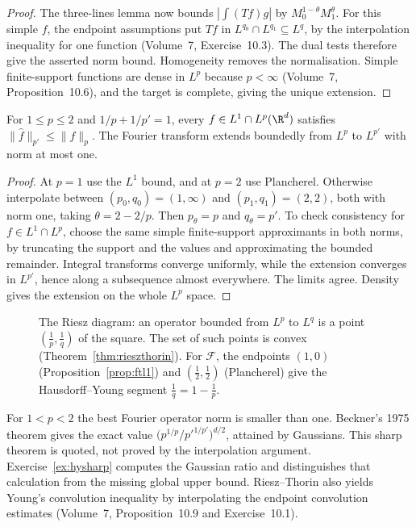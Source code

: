 \begin{proof}
The three-lines lemma now bounds $|\int(Tf)g|$ by $M_0^{1-\theta}M_1^\theta$. For this simple $f$, the endpoint assumptions put $Tf$ in $L^{q_0}\cap L^{q_1}\subseteq L^q$, by the interpolation inequality for one function (Volume~7, Exercise~10.3). The dual tests therefore give the asserted norm bound. Homogeneity removes the normalisation. Simple finite-support functions are dense in $L^p$ because $p<\infty$ (Volume~7, Proposition~10.6), and the target is complete, giving the unique extension.
\end{proof}

\begin{corollary}\label{cor:hausdorffyoung}
For $1\le p\le2$ and $1/p+1/p'=1$, every $f\in L^1\cap L^p(\R^d)$ satisfies $\|\hat f\|_{p'}\le\|f\|_p$. The Fourier transform extends boundedly from $L^p$ to $L^{p'}$ with norm at most one.
\end{corollary}
\begin{proof}
At $p=1$ use the $L^1$ bound, and at $p=2$ use Plancherel. Otherwise interpolate between $(p_0,q_0)=(1,\infty)$ and $(p_1,q_1)=(2,2)$, both with norm one, taking $\theta=2-2/p$. Then $p_\theta=p$ and $q_\theta=p'$. To check consistency for $f\in L^1\cap L^p$, choose the same simple finite-support approximants in both norms, by truncating the support and the values and approximating the bounded remainder. Integral transforms converge uniformly, while the extension converges in $L^{p'}$, hence along a subsequence almost everywhere. The limits agree. Density gives the extension on the whole $L^p$ space.
\end{proof}

\begin{figure}[ht]
\centering
{}
\caption{The Riesz diagram: an operator bounded from $L^p$ to $L^q$ is a point $(\frac1p,\frac1q)$ of the square. The set of such points is convex (Theorem~\ref{thm:rieszthorin}). For $\mathcal F$, the
endpoints $(1,0)$ (Proposition~\ref{prop:ftl1}) and $(\frac12,\frac12)$ (Plancherel) give the Hausdorff--Young segment $\frac1q=1-\frac1p$.}
\label{fig:riesz}
\end{figure}

For $1<p<2$ the best Fourier operator norm is smaller than one. Beckner's 1975 theorem gives the exact value
$\bigl(p^{1/p}/p'^{1/p'}\bigr)^{d/2}$,
attained by Gaussians. This sharp theorem is quoted, not proved by the interpolation argument. Exercise~\ref{ex:hysharp} computes the Gaussian ratio and distinguishes that calculation from the missing global upper bound. Riesz--Thorin also yields Young's convolution inequality by interpolating the endpoint convolution estimates (Volume~7, Proposition~10.9 and Exercise~10.1).

